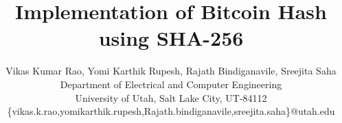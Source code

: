 \documentclass[journal]{IEEEtran}
\begin{document}
\title{Implementation of Bitcoin Hash using SHA-256} 
\author{Vikas Kumar Rao, Yomi Karthik Rupesh, Rajath Bindiganavile, Sreejita Saha \\
	Department of  Electrical and Computer Engineering\\
	University of Utah, Salt Lake City, UT-84112\\\{vikas.k.rao,yomikarthik.rupesh,Rajath.bindiganavile,sreejita.saha\}@utah.edu}
\maketitle


%

%
%
%
%
%
%
%





\end{document}

